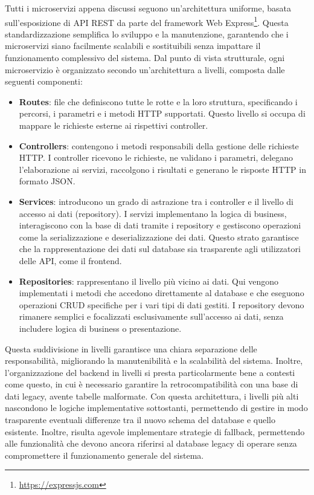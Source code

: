 Tutti i microservizi appena discussi seguono un'architettura uniforme, basata sull'esposizione di API REST da parte del framework Web Express\footnote{\url{https://expressjs.com}}. Questa standardizzazione semplifica lo sviluppo e la manutenzione, garantendo che i microservizi siano facilmente scalabili e sostituibili senza impattare il funzionamento complessivo del sistema. Dal punto di vista strutturale, ogni microservizio è organizzato secondo un'architettura a livelli, composta dalle seguenti componenti:
\begin{itemize}
  \item \textbf{Routes}: file che definiscono tutte le rotte e la loro struttura, specificando i percorsi, i parametri e i metodi HTTP supportati. Questo livello si occupa di mappare le richieste esterne ai rispettivi controller.

  \item \textbf{Controllers}: contengono i metodi responsabili della gestione delle richieste HTTP. I controller ricevono le richieste, ne validano i parametri, delegano l'elaborazione ai servizi, raccolgono i risultati e generano le risposte HTTP in formato JSON.

  \item \textbf{Services}: introducono un grado di astrazione tra i controller e il livello di accesso ai dati (repository). I servizi implementano la logica di business, interagiscono con la base di dati tramite i repository e gestiscono operazioni come la serializzazione e deserializzazione dei dati. Questo strato garantisce che la rappresentazione dei dati sul database sia trasparente agli utilizzatori delle API, come il frontend.

  \item \textbf{Repositories}: rappresentano il livello più vicino ai dati. Qui vengono implementati i metodi che accedono direttamente al database e che eseguono operazioni CRUD specifiche per i vari tipi di dati gestiti. I repository devono rimanere semplici e focalizzati esclusivamente sull'accesso ai dati, senza includere logica di business o presentazione.
\end{itemize}

Questa suddivisione in livelli garantisce una chiara separazione delle responsabilità, migliorando la manutenibilità e la scalabilità del sistema. Inoltre, l'organizzazione del backend in livelli si presta particolarmente bene a contesti come questo, in cui è necessario garantire la retrocompatibilità con una base di dati legacy, avente tabelle malformate. Con questa architettura, i livelli più alti nascondono le logiche implementative sottostanti, permettendo di gestire in modo trasparente eventuali differenze tra il nuovo schema del database e quello esistente. Inoltre, risulta agevole implementare strategie di fallback, permettendo alle funzionalità che devono ancora riferirsi al database legacy di operare senza compromettere il funzionamento generale del sistema.
